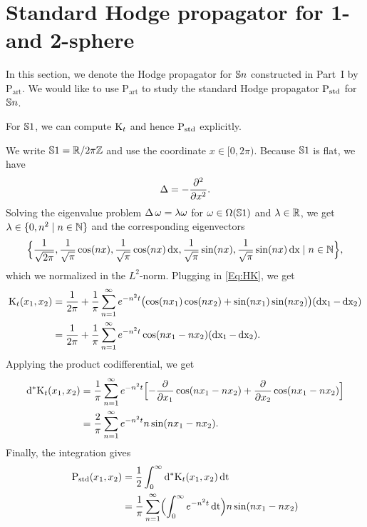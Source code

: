 \documentclass[\MainFolder/Text.tex]{subfiles}
\newcommand{\ArtPrpg}{\mathrm{P}_{\mathrm{art}}}
\begin{document}
\section{Standard Hodge propagator for 1- and 2-sphere}\label{Sec:GrSpgh}
\allowdisplaybreaks

In this section, we denote the Hodge propagator for $\mathbb{S}{n}$ constructed in Part~I by $\ArtPrpg$. We would like to use $\ArtPrpg$ to study the standard Hodge propagator $\mathrm{P}_{\mathrm{std}}$ for $\mathbb{S}{n}$.

For $\mathbb{S}{1}$, we can compute $\mathrm{K}_t$ and hence $\mathrm{P}_{\mathrm{std}}$ explicitly. 

\begin{Example}\label{Ex:SADQQ}
We write $\mathbb{S}{1} = \mathbb{R}/2\pi\mathbb{Z}$ and use the coordinate $x\in [0,2\pi)$. Because $\mathbb{S}{1}$ is flat, we have
$$ \operatorname{\Delta} = - \frac{\partial^2}{\partial x^2}. $$
Solving the eigenvalue problem $\operatorname{\Delta} \omega = \lambda \omega$ for $\omega\in \Omega(\mathbb{S}{1})$ and $\lambda\in \mathbb{R}$, we get $\lambda\in \{0, n^2 \mid n\in\mathbb{N}\}$ and the corresponding eigenvectors
\begin{align*}
\Bigl\{\frac{1}{\sqrt{2 \pi}}, \frac{1}{\sqrt{\pi}} \cos(nx), \frac{1}{\sqrt{\pi}} \cos(nx) \operatorname{dx}, \frac{1}{\sqrt{\pi}} \sin(nx), \frac{1}{\sqrt{\pi}} \sin(nx) \operatorname{dx} \mid n\in \mathbb{N}\Bigr\},
\end{align*}
which we normalized in the $L^2$-norm. Plugging in \eqref{Eq:HK}, we get
\begin{align*}
\mathrm{K}_t(x_1,x_2) & = \frac{1}{2\pi} + \frac{1}{\pi}\sum_{n=1}^\infty e^{-n^2 t}\bigl(\cos(nx_1) \cos(nx_2) + \sin(nx_1)\sin(nx_2) \bigr) (\operatorname{dx_1}-\operatorname{dx_2}) \\
& = \frac{1}{2\pi} + \frac{1}{\pi}\sum_{n=1}^\infty e^{-n^2 t}\cos(nx_1 - nx_2)(\operatorname{dx_1}-\operatorname{dx_2}).
\end{align*}
Applying the product codifferential, we get
\begin{align*}
\mathrm{d}^* \mathrm{K}_t(x_1,x_2) &= \frac{1}{\pi}\sum_{n=1}^\infty e^{-n^2 t}\Bigl[- \frac{\partial}{\partial x_1}\cos(nx_1-nx_2)+\frac{\partial}{\partial x_2}\cos(nx_1-nx_2)\Bigr] \\
& = \frac{2}{\pi} \sum_{n=1}^\infty e^{-n^2 t} n \sin(n x_1 - n x_2). 
\end{align*}
Finally, the integration gives
\begin{align*}
\StdPrpg(x_1,x_2) &= \frac{1}{2}\int_0^\infty \CoDd\KKer_t(x_1,x_2) \Diff{t} \\
&=\frac{1}{\pi}\sum_{n=1}^\infty \Bigl(\int_0^\infty e^{-n^2 t} \Diff{t}\Bigr)n\sin(nx_1 - nx_2) \\

\end{align*}
\end{Example}
\end{document}
